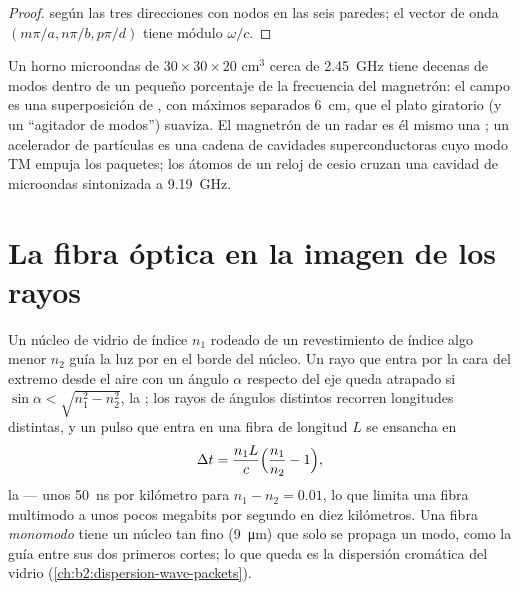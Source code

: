 \begin{proof}
 según las tres direcciones con nodos en las seis paredes;
el vector de onda $(m\pi/a, n\pi/b, p\pi/d)$ tiene módulo $\omega/c$.
\end{proof}

\begin{example}\label{ex:b2:guided-waves:cavities}
Un horno microondas de $30 \times 30 \times 20$ cm$^3$ cerca de \qty{2.45}{GHz} tiene
decenas de modos dentro de un pequeño porcentaje de la frecuencia del magnetrón:
el campo es una superposición de , con máximos separados
\qty{6}{cm}, que el plato giratorio (y un ``agitador de modos'') suaviza.
El magnetrón de un radar es él mismo una ; un acelerador
de partículas es una cadena de cavidades superconductoras cuyo modo TM
empuja los paquetes; los átomos de un reloj de cesio cruzan una cavidad
de microondas sintonizada a \qty{9.19}{GHz}.
\end{example}

\section{La fibra óptica en la imagen de los rayos}

\begin{proposition}\label{prop:b2:guided-waves:fibre}
Un núcleo de vidrio de índice $n_1$ rodeado de un revestimiento de índice
algo menor $n_2$ guía la luz por  en el borde del
núcleo. Un rayo que entra por la cara del extremo desde el aire con un ángulo $\alpha$ respecto
del eje queda atrapado si $\sin\alpha < \sqrt{n_1^2 - n_2^2}$, la \emph{}; los rayos de ángulos distintos recorren longitudes distintas, y un
pulso que entra en una fibra de longitud $L$ se ensancha en
\[
\Delta t = \frac{n_1L}c\Bigl(\frac{n_1}{n_2} - 1\Bigr) ,
\]
la \emph{} --- unos \qty{50}{ns} por kilómetro para $n_1
- n_2 = 0.01$, lo que limita una fibra multimodo a unos pocos megabits por
segundo en diez kilómetros. Una fibra \emph{monomodo} tiene un núcleo tan
fino (\qty{9}{\micro m}) que solo se propaga un modo, como la guía
entre sus dos primeros cortes; lo que queda es la dispersión
cromática del vidrio (\cref{ch:b2:dispersion-wave-packets}).
\end{proposition}

